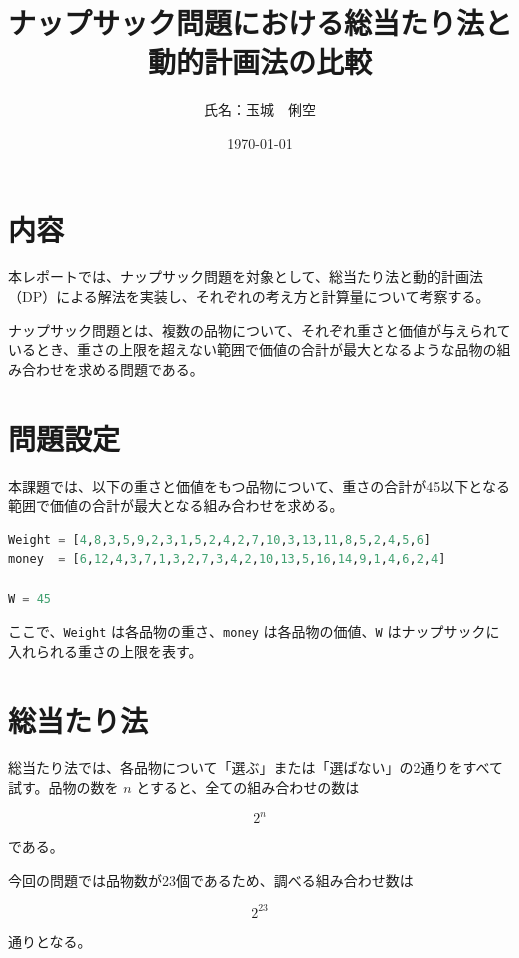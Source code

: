 \documentclass[dvipdfmx,a4paper,11pt]{jsarticle}
\title{ナップサック問題における総当たり法と動的計画法の比較}
\author{氏名：玉城　俐空}
\date{\today}
\begin{document}
\maketitle
\newpage
\tableofcontents
\newpage

\section{内容}

本レポートでは、ナップサック問題を対象として、総当たり法と動的計画法（DP）による解法を実装し、それぞれの考え方と計算量について考察する。

ナップサック問題とは、複数の品物について、それぞれ重さと価値が与えられているとき、重さの上限を超えない範囲で価値の合計が最大となるような品物の組み合わせを求める問題である。

\section{問題設定}

本課題では、以下の重さと価値をもつ品物について、重さの合計が45以下となる範囲で価値の合計が最大となる組み合わせを求める。

\begin{lstlisting}[language=Python, caption=問題で用いるデータ]
Weight = [4,8,3,5,9,2,3,1,5,2,4,2,7,10,3,13,11,8,5,2,4,5,6]
money  = [6,12,4,3,7,1,3,2,7,3,4,2,10,13,5,16,14,9,1,4,6,2,4]

W = 45
\end{lstlisting}

ここで、\texttt{Weight} は各品物の重さ、\texttt{money} は各品物の価値、\texttt{W} はナップサックに入れられる重さの上限を表す。

\section{総当たり法}

総当たり法では、各品物について「選ぶ」または「選ばない」の2通りをすべて試す。品物の数を $n$ とすると、全ての組み合わせの数は

\[
2^n
\]

である。

今回の問題では品物数が23個であるため、調べる組み合わせ数は

\[
2^{23}
\]

通りとなる。
\end{document}
